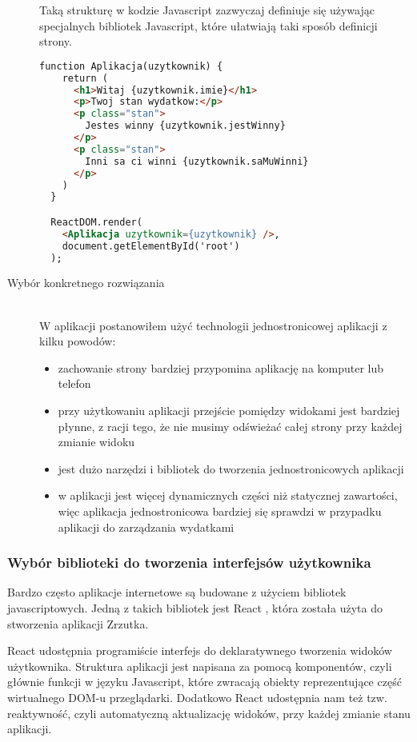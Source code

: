 \begin{description}
  Taką strukturę w kodzie Javascript zazwyczaj definiuje się używając specjalnych bibliotek Javascript, które ułatwiają taki sposób definicji strony.

  \begin{lstlisting}[language=HTML, caption=Przykład aplikacji z użyciem biblioteki javascriptowej, label={lst:reactCode}]
  function Aplikacja(uzytkownik) {
    return (
      <h1>Witaj {uzytkownik.imie}</h1>
      <p>Twoj stan wydatkow:</p>
      <p class="stan">
        Jestes winny {uzytkownik.jestWinny}
      </p>
      <p class="stan">
        Inni sa ci winni {uzytkownik.saMuWinni}
      </p>
    )
  }

  ReactDOM.render(
    <Aplikacja uzytkownik={uzytkownik} />,
    document.getElementById('root')
  );
  \end{lstlisting}
  \item[Wybór konkretnego rozwiązania] \hfill \\ W aplikacji postanowiłem użyć technologii jednostronicowej aplikacji z kilku powodów:
  \begin{itemize}
    \item zachowanie strony bardziej przypomina aplikację na komputer lub telefon
    \item przy użytkowaniu aplikacji przejście pomiędzy widokami jest bardziej płynne, z racji tego, że nie musimy odświeżać całej strony przy każdej zmianie widoku
    \item jest dużo narzędzi i bibliotek do tworzenia jednostronicowych aplikacji
    \item w aplikacji jest więcej dynamicznych części niż statycznej zawartości, więc aplikacja jednostronicowa bardziej się sprawdzi w przypadku aplikacji do zarządzania wydatkami
  \end{itemize}
\end{description}

\subsubsection{Wybór biblioteki do tworzenia interfejsów użytkownika}
Bardzo często aplikacje internetowe są budowane z użyciem bibliotek javascriptowych. Jedną z takich bibliotek jest React \cite{ref_react_doc}, która została użyta do stworzenia aplikacji Zrzutka.

React udostępnia programiście interfejs do deklaratywnego tworzenia widoków użytkownika. Struktura aplikacji jest napisana za pomocą komponentów, czyli głównie funkcji w języku Javascript, które zwracają obiekty reprezentujące część wirtualnego DOM-u przeglądarki. Dodatkowo React udostępnia nam też tzw. reaktywność, czyli automatyczną aktualizację widoków, przy każdej zmianie stanu aplikacji.

